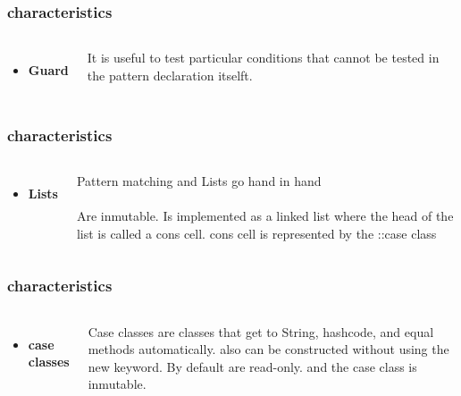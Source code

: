 \documentclass{beamer}
\begin{document}
\begin{frame}
\frametitle{characteristics}
\begin{columns}[c]
\begin{itemize}
\item \textbf{Guard}
\end{itemize}
It is useful to test particular conditions that cannot be tested in the pattern declaration itselft.
\end{columns}
\end{frame}
\begin{frame}
\frametitle{characteristics}
\begin{columns}[c]
\begin{itemize}
\item \textbf{Lists}
\end{itemize}
Pattern matching and Lists go hand in hand
\\~\\
Are inmutable. Is implemented as a linked list where the head of the list is called a cons cell. cons cell is represented by the ::case class
\end{columns}
\end{frame}
\begin{frame}
\frametitle{characteristics}
\begin{columns}[c]
\begin{itemize}
\item \textbf{case classes}
\end{itemize}
Case classes are classes that get to String, hashcode, and equal methods automatically. also can be constructed without using the new keyword. By default are read-only. and the case class is inmutable.
\end{columns}
\end{frame}
\end{document}
